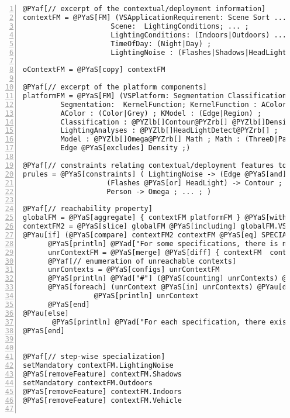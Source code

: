 \documentclass{article}
\begin{document}
\section*{}

\begin{Verbatim}[commandchars=@\[\],numbers=left,firstnumber=1,stepnumber=1]
@PYaf[// excerpt of the contextual/deployment information]
contextFM = @PYaS[FM] (VSApplicationRequirement: Scene Sort ... ; 
	  			     Scene:  LightingConditions; ... ; 
				     LightingConditions: (Indoors|Outdoors) ... ; ... ;
				     TimeOfDay: (Night|Day) ; 
				     LightingNoise : (Flashes|Shadows|HeadLight) ; )

oContextFM = @PYaS[copy] contextFM

@PYaf[// excerpt of the platform components]
platformFM = @PYaS[FM] (VSPlatform: Segmentation Classification @PYZlb[]LightingAnalyses@PYZrb[]; 
		 Segmentation:  KernelFunction; KernelFunction : AColor KModel ; 
		 AColor : (Color|Grey) ; KModel : (Edge|Region) ;
		 Classification : @PYZlb[]Contour@PYZrb[] @PYZlb[]Density@PYZrb[] @PYZlb[]Model@PYZrb[] ; 
		 LightingAnalyses : @PYZlb[]HeadLightDetect@PYZrb[] ; 
		 Model : @PYZlb[]Omega@PYZrb[] Math ; Math : (ThreeD|Paral|Ellipse);
		 Edge @PYaS[excludes] Density ;)

@PYaf[// constraints relating contextual/deployment features to software features 		 ]
prules = @PYaS[constraints] ( LightingNoise -> (Edge @PYaS[and] LightingAnalyses) ; 
					(Flashes @PYaS[or] HeadLight) -> Contour ; 
					Person -> Omega ; ... ; ) 

@PYaf[// reachability property]
globalFM = @PYaS[aggregate] { contextFM platformFM } @PYaS[withMapping] prules
contextFM2 = @PYaS[slice] globalFM @PYaS[including] globalFM.VSApplicationRequirement*
@PYau[if] (@PYaS[compare] contextFM2 contextFM @PYaS[eq] SPECIALIZATION) @PYaS[then] 
      @PYaS[println] @PYad["For some specifications, there is no software configuration..."] 
      unrContextFM = @PYaS[merge] @PYaS[diff] { contextFM  contextFM2 }    
      @PYaf[// enumeration of unreachable contexts]
      unrContexts = @PYaS[configs] unrContextFM
      @PYaS[println] @PYad["#"] (@PYaS[counting] unrContexts) @PYad[" specifications cannot be reached: "] 
      @PYaS[foreach] (unrContext @PYaS[in] unrContexts) @PYau[do] 
                 @PYaS[println] unrContext
      @PYaS[end]
@PYau[else]
       @PYaS[println] @PYad["For each specification, there exists at least one software configuration"]
@PYaS[end]


@PYaf[// step-wise specialization]
setMandatory contextFM.LightingNoise
@PYaS[removeFeature] contextFM.Shadows
setMandatory contextFM.Outdoors
@PYaS[removeFeature] contextFM.Indoors
@PYaS[removeFeature] contextFM.Vehicle 


\end{Verbatim}
\end{document}
